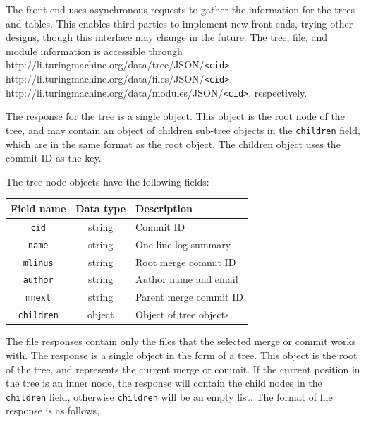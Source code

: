 \documentclass[conference, draftclsnofoot, draft]{IEEEtran}
\begin{document}

The front-end uses asynchronous requests to gather the information for the trees and
tables. This enables third-parties to implement new front-ends, trying other
designs, though this interface may change in the future. The tree, file, and module
information is accessible through
http://li.turingmachine.org/data/tree/JSON/\verb|<cid>|,
http://li.turingmachine.org/data/files/JSON/\verb|<cid>|,
http://li.turingmachine.org/data/modules/JSON/\verb|<cid>|, respectively.

The response for the tree is a single object. This object is the root node of the
tree, and may contain an object of children sub-tree objects in the \verb|children|
field, which are in the same format as the root object. The children object uses the
commit ID as the key.

The tree node objects have the following fields:

\begin{tabular}{ccl}
        Field name      & Data type & Description\\\hline
        \verb|cid|      & string    & Commit ID\\
        \verb|name|     & string    & One-line log summary\\
        \verb|mlinus|   & string    & Root merge commit ID\\
        \verb|author|   & string    & Author name and email\\
        \verb|mnext|    & string    & Parent merge commit ID\\
        \verb|children| & object    & Object of tree objects\\
\end{tabular}

The file responses contain only the files that the selected merge or commit works
with. The response is a single object in the form of a tree. This object is the root
of the tree, and represents the current merge or commit. If the current position in
the tree is an inner node, the response will contain the child nodes in the
\verb|children| field, otherwise \verb|children| will be an empty list. The format of file
response is as follows,
\end{document}
